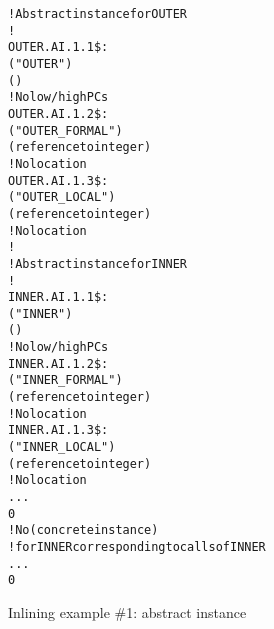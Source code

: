 \begin{figure}[p]
\begin{dwflisting}
\begin{alltt}
    ! Abstract instance for OUTER
    ! 
OUTER.AI.1.1\$:
    \DWTAGsubprogram
        \DWATname("OUTER")
        \DWATinline(\DWINLdeclaredinlined)
        ! No low/high PCs
OUTER.AI.1.2\$:
        \DWTAGformalparameter
            \DWATname("OUTER\_FORMAL")
            \DWATtype(reference to integer)
            ! No location
OUTER.AI.1.3\$:
        \DWTAGvariable
            \DWATname("OUTER\_LOCAL")
            \DWATtype(reference to integer)
            ! No location
        !
        ! Abstract instance for INNER
        !
INNER.AI.1.1\$:
        \DWTAGsubprogram
            \DWATname("INNER")
            \DWATinline(\DWINLdeclaredinlined)
            ! No low/high PCs
INNER.AI.1.2\$:
            \DWTAGformalparameter
                \DWATname("INNER\_FORMAL")
                \DWATtype(reference to integer)
                ! No location
INNER.AI.1.3\$:
            \DWTAGvariable
                \DWATname("INNER\_LOCAL")
                \DWATtype(reference to integer)
                ! No location
            ...
            0
        ! No \DWTAGinlinedsubroutine (concrete instance)
        ! for INNER corresponding to calls of INNER
        ...
        0
\end{alltt}
\end{dwflisting}
\caption{Inlining example \#1: abstract instance}
\label{fig:inliningexample1abstractinstance}
\end{figure}


